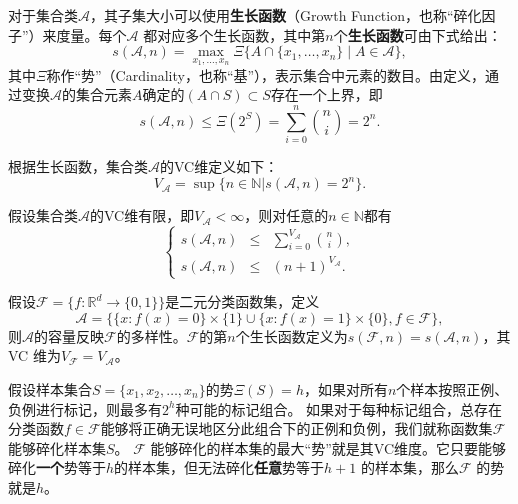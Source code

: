 \begin{definition}[生长函数]
对于集合类$\mathcal A$，其子集大小可以使用\textbf{生长函数}（Growth Function，也称“碎化因子”）来度量。每个$\mathcal{A}$ 都对应多个生长函数，其中第$n$个\textbf{生长函数}可由下式给出：
\begin{equation}\label{eq:shattercoefficicents}
    s(\mathcal{A},n) = \max\limits_{x_1,\ldots,x_n} \Xi\{A\cap\{x_1,\ldots,x_n\}\mid A\in \mathcal A\},
\end{equation}
其中$\Xi$称作“势”（Cardinality，也称“基”），表示集合中元素的数目。由定义，通过变换$\mathcal A$的集合元素$A$确定的$(A\cap S)\subset S$存在一个上界，即
\begin{equation}
    s(\mathcal{A},n) \le \Xi(2^S) = \sum\limits_{i=0}^n \binom{n}{i} = 2^n.
\end{equation}
\end{definition}

\begin{definition}[VC维]
根据生长函数，集合类$\mathcal A$的VC维定义如下：
\begin{equation}\label{eq:vcdimension}
    V_{\mathcal{A}} = \sup \{n\in \mathbb N|s(\mathcal{A},n) = 2^n\}.
\end{equation}
\end{definition}

\begin{lemma}[Sauer引理]
假设集合类$\mathcal A$的VC维有限，即$V_{\mathcal A}<\infty$，则对任意的$n\in \mathbb N$都有
\[
\left\{
\begin{array}{lcl}
    s(\mathcal A, n) &\le& \sum\limits_{i=0}^{V_{\mathcal A}} \binom{n}{i},\\
    s(\mathcal A, n) &\le& (n+1)^{V_{\mathcal A}}.
\end{array}
\right.
\]
\end{lemma}

\begin{definition}[分类器的VC维]
假设$\mathcal F = \{f:\mathbb R^d \rightarrow \{0,1\}\}$是二元分类函数集，定义
\[
    \mathcal A = \{\{x:f(x)=0\}\times \{1\}\cup\{x:f(x)=1\}\times \{0\},f\in \mathcal F\},
\]
则$\mathcal A$的容量反映$\mathcal F$的多样性。$\mathcal F$的第$n$个生长函数定义为$s(\mathcal F,n)=s(\mathcal A,n)$，其VC 维为$V_{\mathcal F}=V_{\mathcal A}$。
\end{definition}

假设样本集合$S=\{x_1,x_2,\ldots,x_n\}$的势$\Xi(S)=h$，如果对所有$n$个样本按照正例、负例进行标记，则最多有$2^h$种可能的标记组合。
如果对于每种标记组合，总存在分类函数$f\in \mathcal F$能够将正确无误地区分此组合下的正例和负例，我们就称函数集$\mathcal F$ 能够碎化样本集$S$。 $\mathcal F$ 能够碎化的样本集的最大“势”就是其VC维度。它只要能够碎化\textbf{一个}势等于$h$的样本集，但无法碎化\textbf{任意}势等于$h+1$ 的样本集，那么$\mathcal F$ 的势就是$h$。

